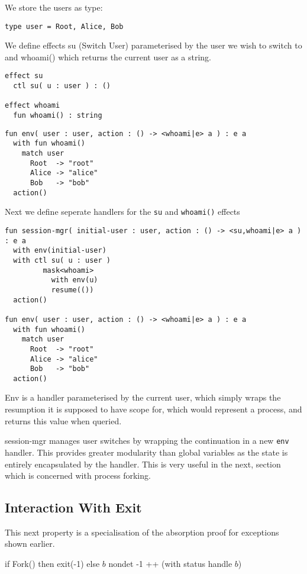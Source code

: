 \documentclass[logo,bsc,singlespacing,parskip]{infthesis}
\begin{document}
We store the users as type:
\begin{lstlisting}
type user = Root, Alice, Bob
\end{lstlisting}

We define effects su (Switch User) parameterised by the user we wish to switch to and whoami() which returns the current user as a string.
\begin{lstlisting}
effect su
  ctl su( u : user ) : ()

effect whoami
  fun whoami() : string
\end{lstlisting}


\begin{lstlisting}
fun env( user : user, action : () -> <whoami|e> a ) : e a
  with fun whoami() 
    match user
      Root  -> "root"
      Alice -> "alice"
      Bob   -> "bob"
  action()
\end{lstlisting}

Next we define seperate handlers for the \texttt{su} and \texttt{whoami()} effects 
\begin{lstlisting}
fun session-mgr( initial-user : user, action : () -> <su,whoami|e> a ) : e a
  with env(initial-user)
  with ctl su( u : user )
         mask<whoami>
           with env(u)
           resume(())
  action()

fun env( user : user, action : () -> <whoami|e> a ) : e a
  with fun whoami() 
    match user
      Root  -> "root"
      Alice -> "alice"
      Bob   -> "bob"
  action()
\end{lstlisting}

Env is a handler parameterised by the current user, which simply wraps the resumption it is supposed to have scope for, which would represent a process, and returns this value when queried. 

session-mgr manages user switches by wrapping the continuation in a new \texttt{env} handler. This provides greater modularity than global variables as the state is entirely encapsulated by the handler. This is very useful in the next, section which is concerned with process forking.


\subsection*{Interaction With Exit}
This next property is a specialisation of the absorption proof for exceptions shown earlier.


{if Fork() then exit(-1) else $b$}
{nondet}
{-1 ++ (with status handle $b$)}
\end{document}
